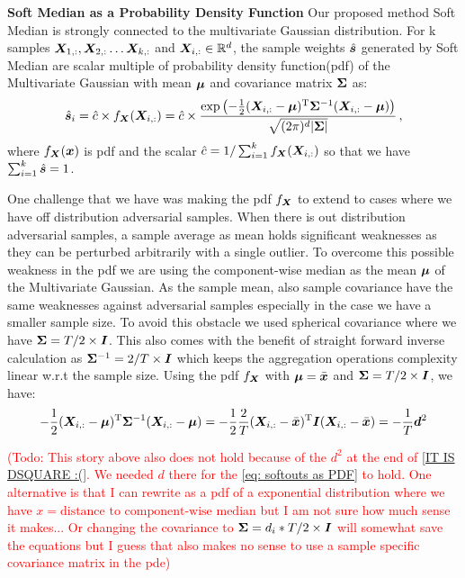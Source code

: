 \documentclass{article} %
\newcommand{\features}{\mX}
\newcommand{\softout}{\vs}
\newcommand{\todo}[1]{\textcolor{red}{(Todo: #1)}}
\begin{document}
\textbf{Soft Median as a Probability Density Function}
Our proposed method Soft Median is strongly connected to the multivariate Gaussian distribution. For k samples $\features_{1,:}, \features_{2,:} \dots \features_{k,:}$ and $\features_{i,:} \in \R^d$, the sample weights $\hat{\softout}$ generated by Soft Median are scalar multiple of probability density function(pdf) of the Multivariate Gaussian with mean ${\bm{\mu}}$ and covariance matrix ${\bm{\Sigma}}$ as:
\begin{equation}\label{eq: softouts as PDF}
    \hat{\softout}_i = \hat{c} \times f_\mX(\features_{i,:}) =  \hat{c} \times \frac {\exp \left(-{\frac {1}{2}}(\features_{i,:} -\vmu)^{\mathrm {T} }\mSigma ^{-1}(\features_{i,:}-\vmu)\right)}{\sqrt {(2\pi )^{d}| \mSigma |}}\,,
\end{equation}
where $f_{\bm{X}}({\bm{x}})$ is pdf and the scalar $\hat{c} =1 /  \sum_{i=1}^k f_\mX(\features_{i,:})$ so that we have $\sum_{i=1}^k \hat{\softout} = 1$.

One challenge that we have was making the pdf $f_{\bm{X}}$ to extend to cases where we have off distribution adversarial samples. When there is out distribution adversarial samples, a sample average as mean holds significant weaknesses as they can be perturbed arbitrarily with a single outlier. To overcome this possible weakness in the pdf we are using the component-wise median as the mean ${\bm{\mu}}$ of the Multivariate Gaussian. As the sample mean, also sample covariance have the same weaknesses against adversarial samples especially in the case we have a smaller sample size. To avoid this obstacle we used spherical covariance where we have ${\bm{\Sigma}} = T/2 \times {\bm{I}}$. This also comes with the benefit of straight forward inverse calculation as ${\bm{\Sigma}}^{-1} = 2/T \times {\bm{I}}$ which keeps the aggregation operations complexity linear w.r.t the sample size.
Using the pdf $f_{\bm{X}}$ with ${\bm{\mu}} = \bar{{\bm{x}}}$ and ${\bm{\Sigma}} = T/2 \times {\bm{I}}$, we have:
\begin{equation}\label{IT IS DSQUARE :(}
    -{\frac {1}{2}}(\features_{i,:} -\vmu)^{\mathrm {T} }\mSigma ^{-1}(\features_{i,:}-\vmu) =  -{\frac {1}{2}}{\frac {2}{T}}(\features_{i,:} -\bar{\vx})^{\mathrm {T} }\mI (\features_{i,:}-\bar{\vx}) = -\frac{1}{T}\vd^2
\end{equation}

\todo{This story above also does not hold because of the $d^2$  at the end of \autoref{IT IS DSQUARE :(}. We needed $d$ there for the \autoref{eq: softouts as PDF} to hold. One alternative is that I can rewrite as a pdf of a exponential distribution where we have $x = \text{distance to component-wise median}$ but I am not sure how much sense it makes... Or changing the covariance to ${\bm{\Sigma}} = d_i * T/2 \times {\bm{I}}$ will somewhat save the equations but I guess that also makes no sense to use a sample specific covariance matrix in the pde}
\end{document}
